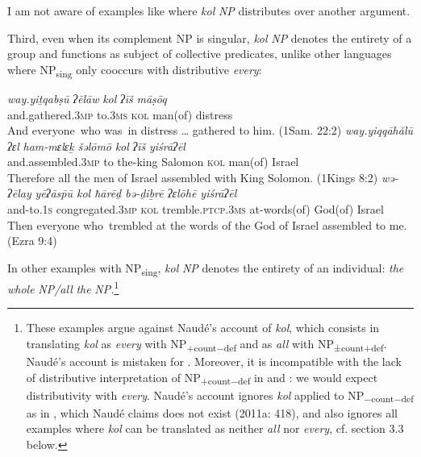 \documentclass[output=paper]{langsci/langscibook}
\begin{document}
I am not aware of examples like  where \textit{kol} \textit{NP} distributes over another argument.

Third, even when its complement NP is singular, \textit{kol} \textit{NP} denotes the entirety of a group and functions as subject of collective predicates, unlike other languages where NP\textsubscript{sing} only cooccurs with distributive \textit{every}: 

\ea%
    \label{ex:doron:16}
    \ea
    \gll \textit{way.yiṯqabṣū}         \textit{ʔēlāw}    \textit{kol}   \textit{ʔīš}           \textit{māṣōq}\\
         and.gathered.3\textsc{mp}  to.\textsc{3ms}  \textsc{kol} man(of) distress \\
    \glt And everyone~who was~in distress … gathered to him. (1Sam. 22:2)
    \ex  
    \gll \textit{way.yiqqāhălū}          \textit{ʔɛl} \textit{ham-mɛlɛḵ}  \textit{šəlōmō}    \textit{kol}   \textit{ʔīš}          \textit{yiśrāʔēl}\\
         and.assembled.3\textsc{mp}  to  the-king      Salomon \textsc{kol} man(of) Israel\\
    \glt Therefore all the men of Israel assembled with King Solomon. (1Kings 8:2)
    \ex  
    \gll \textit{wə-ʔēlay}   \textit{yēʔās\={p}ū                 kol   ħārēḏ                       bə-ḏiḇrē       ʔɛlōhē      yiśrāʔēl}\\
         and-to.\textsc{1s}  congregated.3\textsc{mp}  \textsc{kol} tremble.\textsc{ptcp.3ms}  at-words(of)  God(of)  Israel\\
    \glt Then everyone who~trembled at the words of the God of Israel assembled to me. (Ezra 9:4)
    \z
\z


In other examples with NP\textsubscript{sing}, \textit{kol} \textit{NP} denotes the entirety of an individual: \textit{the} \textit{whole} \textit{NP/all} \textit{the} \textit{NP.}\footnote{These examples argue against Naudé’s \citeyearpar{Naudé2011interpretation} account of \textit{kol}, which consists in translating \textit{kol} as \textit{every} with NP\textsubscript{+count$-$def} and as \textit{all} with NP\textsubscript{±count+def}. Naudé’s account is mistaken for . Moreover, it is incompatible with the lack of distributive interpretation of NP\textsubscript{+count$-$def} in  and : we would expect distributivity with \textit{every}. Naudé’s account ignores \textit{kol} applied to NP\textsubscript{$-$count$-$def} as in , which Naudé claims does not exist (2011a: 418), and also ignores all examples where \textit{kol} can be translated as neither \textit{all} nor \textit{every}, cf. section 3.3 below.}
\end{document}
